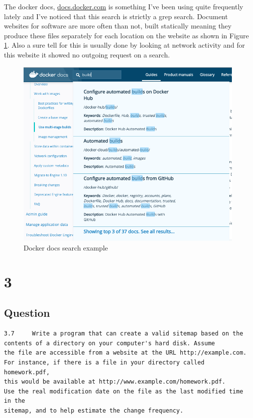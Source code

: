 \documentclass[letterpaper,11pt]{article}
\begin{document}
The docker docs, \url{docs.docker.com} is something I've been using quite frequently lately and I've noticed that this search is strictly a grep search. 
Document websites for software are more often than not, built statically meaning they produce these files separately for each location on the website as shown in Figure \ref{fig:docker}.
Also a sure tell for this is usually done by looking at network activity and for this website it showed no outgoing request on a search.

\begin{figure}[h]
\centering
\includegraphics[scale=0.35]{docker.png}
\caption{Docker docs search example}
\label{fig:docker}
\end{figure}


\clearpage


\section*{3}

\subsection*{Question}

\begin{verbatim}
3.7 	Write a program that can create a valid sitemap based on the 
contents of a directory on your computer's hard disk. Assume 
the file are accessible from a website at the URL http://example.com. 
For instance, if there is a file in your directory called homework.pdf, 
this would be available at http://www.example.com/homework.pdf. 
Use the real modification date on the file as the last modified time in the 
sitemap, and to help estimate the change frequency.
\end{verbatim}
\end{document}
